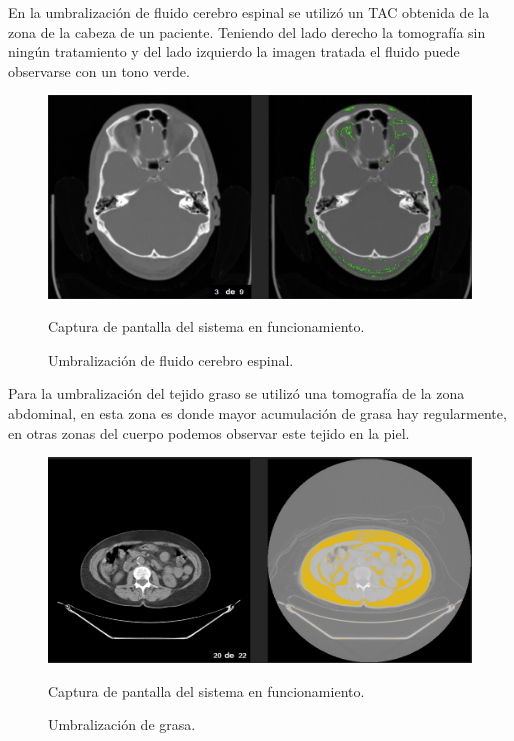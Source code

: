 \documentclass[12pt]{report}
\begin{document}
\newpage
\vspace*{3cm}
En la umbralización de fluido cerebro espinal se utilizó un TAC obtenida de la zona de la cabeza de un paciente. Teniendo del lado derecho la tomografía sin ningún tratamiento y del lado izquierdo la imagen tratada el fluido puede observarse con un tono verde.  
\begin{figure}[H]
\centering
\includegraphics[width = 15 cm, height = 8 cm]{umbralFluidoCerebralEspinal}
\caption{Umbralización de fluido cerebro espinal.}
Captura de pantalla del sistema en funcionamiento.
\end{figure}

\newpage
\vspace*{3cm}
Para la umbralización del tejido graso se utilizó una tomografía de la zona abdominal, en esta zona es donde mayor acumulación de grasa hay regularmente, en otras zonas del cuerpo podemos observar este tejido en la piel.
\begin{figure}[H]
\centering
\includegraphics[width = 15 cm, height = 8 cm]{umbralGrasa}
\caption{Umbralización de grasa.}
Captura de pantalla del sistema en funcionamiento.
\end{figure}
\end{document}
